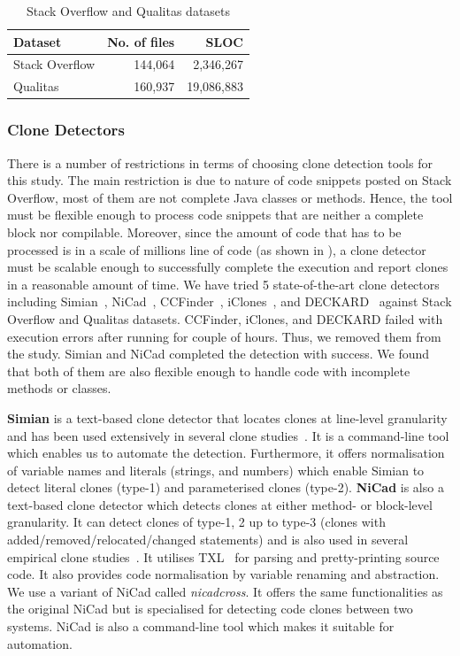 \documentclass[sigconf,review, anonymous]{acmart}
\begin{document}
\begin{table}
	\centering
	\caption{Stack Overflow and Qualitas datasets}
	\label{tab:datasets}
	\small
	\begin{tabular}{l|r|r}
		\hline 
		Dataset & No. of files & SLOC \\
		\hline
		Stack Overflow & 144,064 & 2,346,267 \\ 
		\hline 
		Qualitas &  160,937 & 19,086,883 \\ 
		\hline 
	\end{tabular} 
\end{table}

\subsubsection{Clone Detectors}
There is a number of restrictions in terms of choosing clone detection tools for this study. The main restriction is due to nature of code snippets posted on Stack Overflow, most of them are not complete Java classes or methods. Hence, the tool must be flexible enough to process code snippets that are neither a complete block nor compilable. Moreover, since the amount of code that has to be processed is in a scale of millions line of code (as shown in ), a clone detector must be scalable enough to successfully complete the execution and report clones in a reasonable amount of time. We have tried 5 state-of-the-art clone detectors including Simian~\cite{simian}, NiCad~\cite{Cordy,Roy2008}, CCFinder~\cite{Kamiya2002}, iClones~\cite{Gode2009}, and DECKARD~\cite{Jiang2007a} against Stack Overflow and Qualitas datasets. CCFinder, iClones, and DECKARD failed with execution errors after running for couple of hours. Thus, we removed them from the study. Simian and NiCad completed the detection with success. We found that both of them are also flexible enough to handle code with incomplete methods or classes. %

\textbf{Simian} is a text-based clone detector that locates clones at line-level granularity and has been used extensively in several clone studies~\cite{Ragkhitwetsagul2016, Wang2013, Mondal2011, Cheung2015, Krinke2010}. It is a command-line tool which enables us to automate the detection. Furthermore, it offers normalisation of variable names and literals (strings, and numbers) which enable Simian to detect literal clones (type-1) and parameterised clones (type-2). \textbf{NiCad} is also a text-based clone detector which detects clones at either method- or block-level granularity. It can detect clones of type-1, 2 up to type-3 (clones with added/removed/relocated/changed statements) and is also used in several empirical clone studies~\cite{Roy2008, Ragkhitwetsagul2016, Svajlenko2014, Wang2013, Mondal2011, Sajnani2016}. It utilises TXL~\cite{Cordy2006} for parsing and pretty-printing source code. It also provides code normalisation by variable renaming and abstraction. We use a variant of NiCad called \textit{nicadcross}. It offers the same functionalities as the original NiCad but is specialised for detecting code clones between two systems. NiCad is also a command-line tool which makes it suitable for automation.
\end{document}
